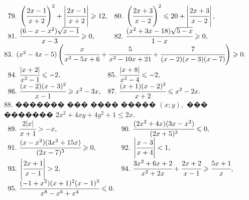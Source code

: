 \documentclass[12pt]{article}
\begin{document}
$\begin{array}{ll}
79.\ \left(\cfrac{2x-1}{x+2}\right)^2+\left|\cfrac{2x-1}{x+2}\right|\geqslant12,&
80.\ \left(\cfrac{2x+3}{x-2}\right)^2\leqslant20+\left|\cfrac{2x+3}{x-2}\right|,\\
81.\ \cfrac{(6-x-x^2)\sqrt{x-1}}{x-3}\geqslant0,&
82.\ \cfrac{(x^2+3x-18)\sqrt{5-x}}{1-x}\geqslant0,
\end{array}$\\
83. $(x^2-4x-5)\left(\cfrac{x}{x^2-5x+6}+\cfrac{5}{x^2-10x+21}+\cfrac{7}{(x-2)(x-3)(x-7)}\right)\geqslant0.$\\
$\begin{array}{ll}
84.\ \cfrac{|x+2|}{x^2-1}\leqslant-2,&
85.\ \cfrac{|x+8|}{x^2-4}\leqslant-2,\\
86.\ \cfrac{(x-2)(x-3)^2}{x-1}\geqslant x^2-3x,&
87.\ \cfrac{(x+1)(x-2)^2}{x+2}\leqslant x^2-2x.
\end{array}$\\
88. ������� ��� ���� ����� $(x;y),$ ��� ������� $2x^2+4xy+4y^2+1\leqslant 2x.$\\
$\begin{array}{ll}
89.\ \cfrac{2|x|}{x+1}>-x,&
90.\ \cfrac{(2x^2+4x)(3x-x^2)}{(2x+5)^3}\leqslant 0,\\
91.\ \cfrac{(x-x^2)(3x^2+15x)}{(2x-7)^3}\geqslant 0,&
92.\ \left|\cfrac{x-3}{x+4}\right|<1,\\
93.\ \left|\cfrac{2x+1}{x-1}\right|>2,&
94.\ \cfrac{3x^2+6x+2}{x^2+2x}+\cfrac{2x+2}{x-1}\geqslant\cfrac{5x+1}{x},\\
95.\ \cfrac{(-1+x^2)(x+1)^2(x-1)^3}{x^8-x^6+x^4}\leqslant0.
\end{array}$
\newpage
\end{document}
